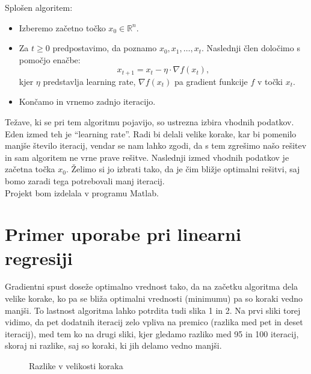 \documentclass{article}
\begin{document}
Splošen algoritem:
\begin{itemize}
\item{Izberemo začetno točko $x_0 \in \mathbb{R}^n $. }
\item{Za $t \geq 0$ predpostavimo, da poznamo $x_0,x_1, \ldots ,x_t $. Naslednji člen določimo s pomočjo enačbe: 
\[ x_{t+1}=x_t - \eta \cdot \nabla f(x_t), \] 
kjer $ \eta$ predstavlja learning rate, $\nabla f(x_t) $ pa gradient funkcije $f$ v točki $x_t$.}
\item{Končamo in vrnemo zadnjo iteracijo.}
\end{itemize}

Težave, ki se pri tem algoritmu pojavijo, so ustrezna izbira vhodnih podatkov. Eden izmed teh je ``learning rate''. Radi bi delali velike korake, kar bi pomenilo manjše število iteracij, vendar se nam lahko zgodi, da s tem zgrešimo našo rešitev in sam algoritem ne vrne prave rešitve. Naslednji izmed vhodnih podatkov je začetna točka $x_0$. Želimo si jo izbrati tako, da je čim bližje optimalni rešitvi, saj bomo zaradi tega potrebovali manj iteracij.\\

Projekt bom izdelala v programu Matlab.


\section{Primer uporabe pri linearni regresiji}
Gradientni spust doseže optimalno vrednost tako, da na začetku algoritma dela velike korake, ko pa se bliža optimalni vrednosti (minimumu) pa so koraki vedno manjši. To lastnost algoritma lahko potrdita tudi slika 1 in 2. Na prvi sliki torej vidimo, da pet dodatnih iteracij zelo vpliva na premico (razlika med pet in deset iteracij), med tem ko na drugi sliki, kjer gledamo razliko med 95 in 100 iteracij, skoraj ni razlike, saj so koraki, ki jih delamo vedno manjši. \\



\begin{figure}[h]
    \centering
    \caption{Razlike v velikosti koraka}
    \label{fig:foobar}
\end{figure}
\end{document}
